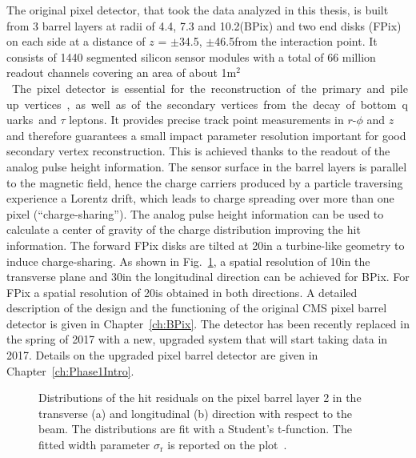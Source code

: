 The original pixel detector, that took the data analyzed in this thesis, is built from 3 barrel layers at radii of 4.4, 7.3 and 10.2\cm (BPix) and two end disks (FPix) on each side at a distance of $z$ = $\pm$34.5, $\pm$46.5\cm from the interaction point. It consists of 1440 segmented silicon sensor modules with a total of 66 million readout channels covering an area of about 1\unit{m$^2$}. The pixel detector is essential for the reconstruction of the primary and pileup vertices, as well as of the secondary vertices from the decay of bottom quarks and $\tau$ leptons. It provides precise track point measurements in $r$-$\phi$ and $z$ and therefore guarantees a small impact parameter resolution important for good secondary vertex reconstruction. This is achieved thanks to the readout of the analog pulse height information. The sensor surface in the barrel layers is parallel to the magnetic field, hence the charge carriers produced by a particle traversing experience a Lorentz drift, which leads to charge spreading over more than one pixel (``charge-sharing''). The analog pulse height information can be used to calculate a center of gravity of the charge distribution improving the hit information. The forward FPix disks are tilted at 20\de in a turbine-like geometry to induce charge-sharing. As shown in Fig.~\ref{fig:pxRes}, a spatial resolution of 10\mum in the transverse plane and 30\mum in the longitudinal direction can be achieved for BPix. For FPix a spatial resolution of 20\mum is obtained in both directions. %
A detailed description of the design and the functioning of the original CMS pixel barrel detector is given in Chapter~\ref{ch:BPix}.
The detector has been recently replaced in the spring of 2017 with a new, upgraded system that will start taking data in 2017. Details on the upgraded pixel barrel detector are given in Chapter~\ref{ch:Phase1Intro}.\\

\begin{figure}[h]
 \begin{center}
 \end{center}
 \caption{Distributions of the hit residuals on the pixel barrel layer 2 in the transverse (a) and longitudinal (b) direction with respect to the beam. The distributions are fit with a Student's t-function. The fitted width parameter $\sigma_\mathrm{r}$ is reported on the plot~\cite{PixelOffline}.}
 \label{fig:pxRes}
\end{figure}

